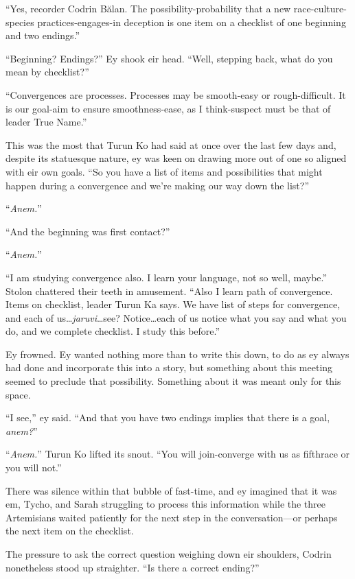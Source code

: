 ``Yes, recorder Codrin Bălan. The possibility-probability that a new race-culture-species practices-engages-in deception is one item on a checklist of one beginning and two endings.''

``Beginning? Endings?'' Ey shook eir head. ``Well, stepping back, what do you mean by checklist?''

``Convergences are processes. Processes may be smooth-easy or rough-difficult. It is our goal-aim to ensure smoothness-ease, as I think-suspect must be that of leader True Name.''

This was the most that Turun Ko had said at once over the last few days and, despite its statuesque nature, ey was keen on drawing more out of one so aligned with eir own goals. ``So you have a list of items and possibilities that might happen during a convergence and we're making our way down the list?''

``\emph{Anem.}''

``And the beginning was first contact?''

``\emph{Anem.}''

``I am studying convergence also. I learn your language, not so well, maybe.'' Stolon chattered their teeth in amusement. ``Also I learn path of convergence. Items on checklist, leader Turun Ka says. We have list of steps for convergence, and each of us\ldots{}\emph{jaruvi}\ldots see? Notice\ldots each of us notice what you say and what you do, and we complete checklist. I study this before.''

Ey frowned. Ey wanted nothing more than to write this down, to do as ey always had done and incorporate this into a story, but something about this meeting seemed to preclude that possibility. Something about it was meant only for this space.

``I see,'' ey said. ``And that you have two endings implies that there is a goal, \emph{anem?}''

``\emph{Anem.}'' Turun Ko lifted its snout. ``You will join-converge with us as fifthrace or you will not.''

There was silence within that bubble of fast-time, and ey imagined that it was em, Tycho, and Sarah struggling to process this information while the three Artemisians waited patiently for the next step in the conversation—or perhaps the next item on the checklist.

The pressure to ask the correct question weighing down eir shoulders, Codrin nonetheless stood up straighter. ``Is there a correct ending?''

